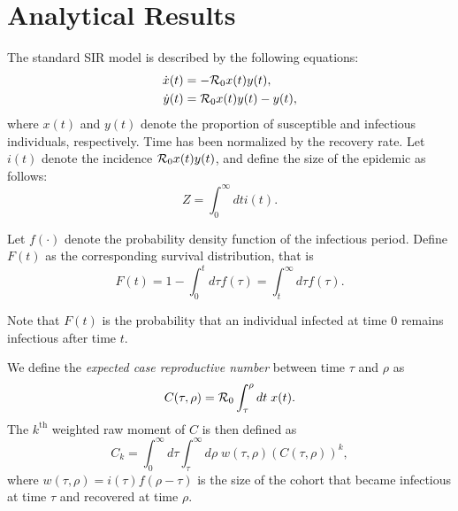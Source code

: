 \renewcommand{\thefigure}{S\arabic{figure}}
\renewcommand*{\thepage}{S\arabic{page}}
\renewcommand{\theequation}{S.\arabic{equation}}
\renewcommand{\thesection}{S.\arabic{section}}
\resetallcounters
 
%
\section{Analytical Results} \label{sec_proof}
The standard SIR model is described by the following equations:
\begin{align*}
        \dot{x}(t) &= - {\mathcal R}_{\mathrm{0}} x(t)y(t), \\
        \dot{y}(t) &= {\mathcal R}_{\mathrm{0}} x(t)y(t) - y(t),
\end{align*}
where $x(t)$ and $y(t)$ denote the proportion of susceptible and infectious individuals, respectively. 
Time has been normalized by the recovery rate.
Let $i(t)$ denote the incidence ${\mathcal R}_{\mathrm{0}} x(t)y(t)$, and define the size of the epidemic as follows:
\[Z = \int_{0}^\infty dt i(t).\]

Let $f(\cdot)$ denote the probability density function of the infectious period. Define $F(t)$ as the corresponding survival distribution, that is
\begin{equation} \label{eq:survial}
    F(t) = 1 - \int_0^t d\tau f(\tau) = \int_t^\infty d\tau f(\tau).
\end{equation}

Note that $F(t)$ is the probability that an individual infected at time $0$ remains infectious after time $t$. 


We define the \emph{expected case reproductive number} between time $\tau$ and $\rho$ as 
\[C(\tau,\rho) = {\mathcal R}_{\mathrm{0}} \int_\tau^\rho dt\; x(t).\]
The $k^\text{th}$ weighted raw moment of $C$ is then defined as
\begin{equation}
    \label{eq:Moments}
    C_k = \int_0^\infty d\tau \int_\tau^\infty d\rho \; w(\tau,\rho) (C(\tau,\rho))^k,
\end{equation}
where $w(\tau,\rho) = i(\tau)f(\rho-\tau)$ is the size of the cohort that became infectious at time $\tau$ and recovered at time $\rho$.

